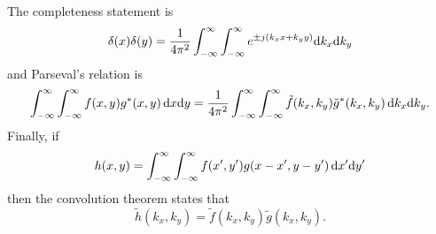 The completeness statement is
\begin{equation}
  \delta(x) \delta(y) = \frac{1}{4\pi^2} 
  \int_{-\infty}^{\infty}\int_{-\infty}^{\infty}
  e^{\pm j(k_x x + k_y y)} \text{d} k_x  \text{d} k_y
\end{equation}
and Parseval's relation is
\begin{equation}
\int_{-\infty}^{\infty} \int_{-\infty}^{\infty}
 f(x,y) g^*(x,y) \, \text{d} x  \text{d} y =   
\frac{1}{4\pi^2} \int_{-\infty}^{\infty} \int_{-\infty}^{\infty} 
\tilde{f}(k_x,k_y) \tilde{g}^*(k_x,k_y) \, \text{d} k_x  \text{d} k_y.
\end{equation}
Finally, if 
\begin{equation}
  h(x,y) = \int_{-\infty}^{\infty}\int_{-\infty}^{\infty}
 f(x',y') g(x-x',y-y') \, \text{d} x'  \text{d} y'
\end{equation}
then the convolution theorem states that
\begin{equation}
  \tilde{h}(k_x,k_y) = \tilde{f}(k_x,k_y) \tilde{g}(k_x,k_y).
\end{equation}


